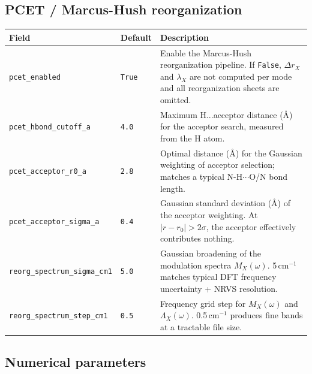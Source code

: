 \documentclass[11pt,a4paper,twoside]{article}
\theoremstyle{remark}
\begin{document}
\subsection{PCET / Marcus-Hush reorganization}

\begin{longtable}{p{} p{} p{}}
\toprule
\textbf{Field} & \textbf{Default} & \textbf{Description} \\
\midrule
\endhead
\texttt{pcet\_enabled} & \texttt{True} & Enable the Marcus-Hush
  reorganization pipeline. If \texttt{False}, $\Delta r_X$ and
  $\lambda_X$ are not computed per mode and all reorganization
  sheets are omitted. \\
\texttt{pcet\_hbond\_cutoff\_a} & \texttt{4.0} & Maximum
  H...acceptor distance (\AA{}) for the acceptor search,
  measured from the H atom. \\
\texttt{pcet\_acceptor\_r0\_a} & \texttt{2.8} & Optimal distance
  (\AA{}) for the Gaussian weighting of acceptor selection;
  matches a typical N-H$\cdots$O/N bond length. \\
\texttt{pcet\_acceptor\_sigma\_a} & \texttt{0.4} & Gaussian
  standard deviation (\AA{}) of the acceptor weighting.
  At $|r - r_0| > 2\sigma$, the acceptor effectively contributes
  nothing. \\
\texttt{reorg\_spectrum\_sigma\_cm1} & \texttt{5.0} & Gaussian
  broadening of the modulation spectra $M_X(\omega)$.
  5\,cm$^{-1}$ matches typical DFT frequency uncertainty +
  NRVS resolution. \\
\texttt{reorg\_spectrum\_step\_cm1} & \texttt{0.5} & Frequency
  grid step for $M_X(\omega)$ and $\Lambda_X(\omega)$.
  0.5\,cm$^{-1}$ produces fine bands at a tractable file size. \\
\bottomrule
\end{longtable}

\subsection{Numerical parameters}
\end{document}
